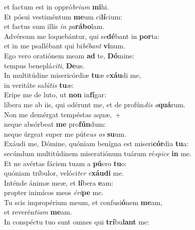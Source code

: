 \oddverse et factum est in oppró\textit{bri}\textit{um} \textbf{mi}hi.\\
\evenverse Et pósui vestiméntum \textbf{me}um ci\textbf{lí}cium:~\*\\
\evenverse et factus sum illis \textit{in} \textit{pa}\textbf{rá}\textbf{bo}lam.\\
\oddverse Advérsum me loquebántur, qui se\textbf{dé}bant in \textbf{por}ta:~\*\\
\oddverse et in me psallébant qui bi\textit{bé}\textit{bant} \textbf{vi}num.\\
\evenverse Ego vero oratiónem meam \textbf{ad} te, \textbf{Dó}mine:~\*\\
\evenverse tempus beneplá\textit{ci}\textit{ti}, \textbf{De}us.\\
\oddverse In multitúdine misericórdiæ \textbf{tu}æ e\textbf{xáu}di me,~\*\\
\oddverse in veritáte sa\textit{lú}\textit{tis} \textbf{tu}æ:\\
\evenverse Eripe me de luto, ut \textbf{non} in\textbf{fí}gar:~\*\\
\evenverse líbera me ab iis, qui odérunt me, et de profún\textit{dis} \textit{a}\textbf{quá}rum.\\
\oddverse Non me demérgat tempéstas aquæ,~+\\
\oddverse  neque absórbeat \textbf{me} pro\textbf{fún}dum:~\*\\
\oddverse neque úrgeat super me púte\textit{us} \textit{os} \textbf{su}um.\\
\evenverse Exáudi me, Dómine, quóniam benígna est miseri\textbf{cór}dia \textbf{tu}a:~\*\\
\evenverse secúndum multitúdinem miseratiónum tuárum ré\textit{spi}\textit{ce} \textbf{in} me.\\
\oddverse Et ne avértas fáciem tuam a \textbf{pú}ero \textbf{tu}o:~\*\\
\oddverse quóniam tríbulor, velóci\textit{ter} \textit{e}\textbf{xáu}\textbf{di} me.\\
\evenverse Inténde ánimæ meæ, et \textbf{lí}bera \textbf{e}am:~\*\\
\evenverse propter inimícos meos \textit{é}\textit{ri}\textbf{pe} me.\\
\oddverse Tu scis impropérium meum, et confusi\textbf{ó}nem \textbf{me}am,~\*\\
\oddverse et reverén\textit{ti}\textit{am} \textbf{me}am.\\
\evenverse In conspéctu tuo sunt omnes qui \textbf{trí}bu\textbf{lant} me:~\*\\
